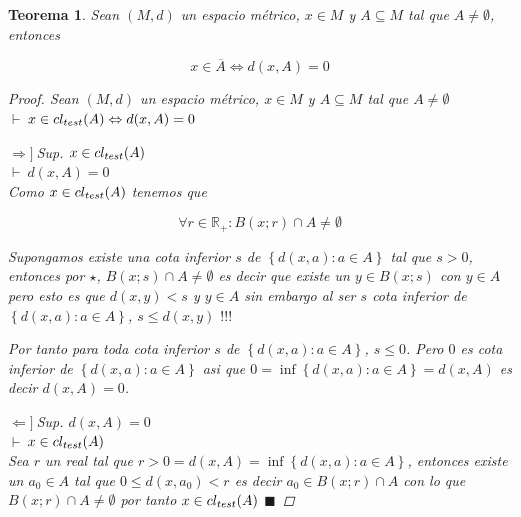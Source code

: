 \documentclass[oneside]{book} %
\theoremstyle{Teorema}
\newtheorem{Teorema}[Definicion]{Teorema}
\theoremstyle{Ejemplos}
\theoremstyle{[Obs]}
\def \test {test}
\newcommand{\cerradura}[2][\test]{\ifx \test #1 {\overline{#2}} \else {cl_{#1}(#2)} \fi} %
\renewcommand{\{}{\left\lbrace} %
\renewcommand{\}}{\right\rbrace} %
\newcommand{\n}{\cap} %
\renewcommand{\sc}{\subseteq} %
\newcommand{\R}{\mathbb{R}} %
\renewcommand{\qed}{$\blacksquare$} %
\newcommand{\pd}{$\vdash\ $} %
\renewcommand{\c}{$!!!\ $} %
\newcommand{\necesidad}{$\Rightarrow]\ $} %
\newcommand{\suficiencia}{$\Leftarrow]\ $} %
\begin{document}
			\begin{Teorema}\setlength{\parindent}{0em}
				
				Sean $(M, d)$ un espacio métrico, $x \in M$ y $A \sc M$ tal que $A \neq \emptyset$, entonces

				\[ x \in \overline{A} \Leftrightarrow d(x, A) = 0 \]

				\begin{proof}
					
					Sean $(M, d)$ un espacio métrico, $x \in M$ y $A \sc M$ tal que $A \neq \emptyset$ \\ 
					\pd $x \in \cerradura{A} \Leftrightarrow d(x, A) = 0$

					\necesidad Sup. $x \in \cerradura{A}$ \\ 
					\pd $d(x, A) = 0$ \\ 
					Como $x \in \cerradura{A}$ tenemos que

					\begin{equation*}\tag{$\star$}
						\forall r \in \R_{+} : B(x;r) \n A \neq \emptyset
					\end{equation*}

					Supongamos existe una cota inferior $s$ de $\{ d(x, a) : a \in A \}$ tal que $s > 0$, entonces por $\star$, $B(x;s) \n A \neq \emptyset$ es decir que existe un $y \in B(x;s)$ con $y \in A$ pero esto es que $d(x, y) < s$ y $y \in A$ sin embargo al ser $s$ cota inferior de $\{ d(x, a) : a \in A \}$, $s \leq d(x, y)$ \c 
					
					Por tanto para toda cota inferior $s$ de $\{ d(x, a) : a \in A \}$, $s \leq 0$. Pero $0$ es cota inferior de $\{ d(x, a) : a \in A \}$ asi que $0 = \inf\{ d(x, a) : a \in A \} = d(x, A)$ es decir $d(x, A) = 0$.

					\suficiencia Sup. $d(x, A) = 0$ \\ 
					\pd $x \in \cerradura{A}$ \\ 
					Sea $r$ un real tal que $r > 0 = d(x, A) = \inf\{ d(x, a) : a \in A \}$, entonces existe un $a_0 \in A$ tal que $0 \leq d(x, a_0) < r$ es decir $a_0 \in B(x;r) \n A$ con lo que $B(x;r) \n A \neq \emptyset$ por tanto $x \in \cerradura{A}$ \qed 

				\end{proof}

			\end{Teorema}
\end{document}
